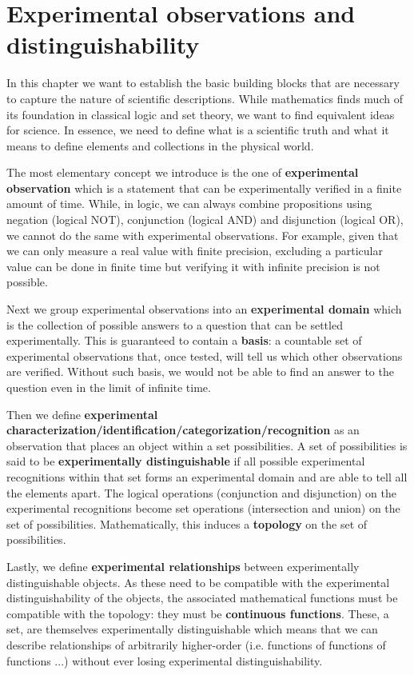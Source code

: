 \documentclass[11pt,letterpaper,fleqn]{memoir} %
\begin{document}
\chapter{Experimental observations and distinguishability}

In this chapter we want to establish the basic building blocks that are necessary to capture the nature of scientific descriptions. While mathematics finds much of its foundation in classical logic and set theory, we want to find equivalent ideas for science. In essence, we need to define what is a scientific truth and what it means to define elements and collections in the physical world.

The most elementary concept we introduce is the one of \textbf{experimental observation} which is a statement that can be experimentally verified in a finite amount of time. While, in logic, we can always combine propositions using negation (logical NOT), conjunction (logical AND) and disjunction (logical OR), we cannot do the same with experimental observations. For example, given that we can only measure a real value with finite precision, excluding a particular value can be done in finite time but verifying it with infinite precision is not possible.

Next we group experimental observations into an \textbf{experimental domain} which is the collection of possible answers to a question that can be settled experimentally. This is guaranteed to contain a \textbf{basis}: a countable set of experimental observations that, once tested, will tell us which other observations are verified. Without such basis, we would not be able to find an answer to the question even in the limit of infinite time.

Then we define \textbf{experimental characterization/identification/categorization/recognition} as an observation that places an object within a set possibilities. A set of possibilities is said to be \textbf{experimentally distinguishable} if all possible experimental recognitions within that set forms an experimental domain and are able to tell all the elements apart. The logical operations (conjunction and disjunction) on the experimental recognitions become set operations (intersection and union) on the set of possibilities. Mathematically, this induces a \textbf{topology} on the set of possibilities.

Lastly, we define \textbf{experimental relationships} between experimentally distinguishable objects. As these need to be compatible with the experimental distinguishability of the objects, the associated mathematical functions must be compatible with the topology: they must be \textbf{continuous functions}. These, a set, are themselves experimentally distinguishable which means that we can describe relationships of arbitrarily higher-order (i.e. functions of functions of functions ...) without ever losing experimental distinguishability.
\end{document}
